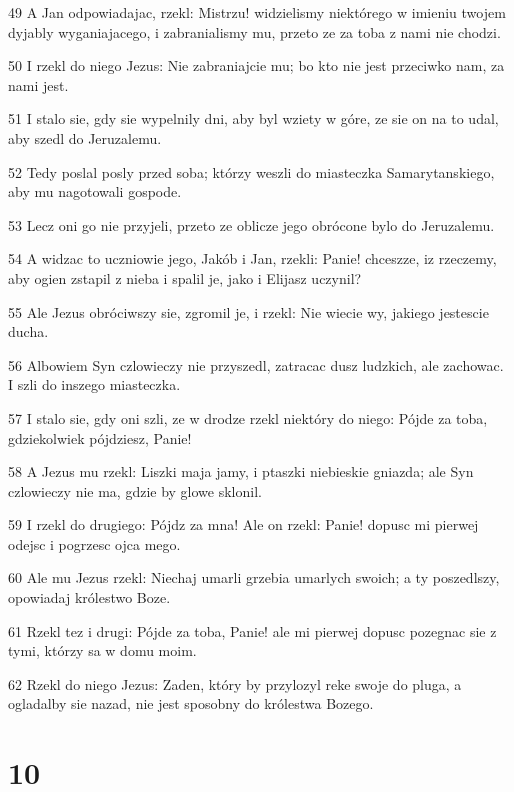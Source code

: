\par 49 A Jan odpowiadajac, rzekl: Mistrzu! widzielismy niektórego w imieniu twojem dyjably wyganiajacego, i zabranialismy mu, przeto ze za toba z nami nie chodzi.
\par 50 I rzekl do niego Jezus: Nie zabraniajcie mu; bo kto nie jest przeciwko nam, za nami jest.
\par 51 I stalo sie, gdy sie wypelnily dni, aby byl wziety w góre, ze sie on na to udal, aby szedl do Jeruzalemu.
\par 52 Tedy poslal posly przed soba; którzy weszli do miasteczka Samarytanskiego, aby mu nagotowali gospode.
\par 53 Lecz oni go nie przyjeli, przeto ze oblicze jego obrócone bylo do Jeruzalemu.
\par 54 A widzac to uczniowie jego, Jakób i Jan, rzekli: Panie! chceszze, iz rzeczemy, aby ogien zstapil z nieba i spalil je, jako i Elijasz uczynil?
\par 55 Ale Jezus obróciwszy sie, zgromil je, i rzekl: Nie wiecie wy, jakiego jestescie ducha.
\par 56 Albowiem Syn czlowieczy nie przyszedl, zatracac dusz ludzkich, ale zachowac. I szli do inszego miasteczka.
\par 57 I stalo sie, gdy oni szli, ze w drodze rzekl niektóry do niego: Pójde za toba, gdziekolwiek pójdziesz, Panie!
\par 58 A Jezus mu rzekl: Liszki maja jamy, i ptaszki niebieskie gniazda; ale Syn czlowieczy nie ma, gdzie by glowe sklonil.
\par 59 I rzekl do drugiego: Pójdz za mna! Ale on rzekl: Panie! dopusc mi pierwej odejsc i pogrzesc ojca mego.
\par 60 Ale mu Jezus rzekl: Niechaj umarli grzebia umarlych swoich; a ty poszedlszy, opowiadaj królestwo Boze.
\par 61 Rzekl tez i drugi: Pójde za toba, Panie! ale mi pierwej dopusc pozegnac sie z tymi, którzy sa w domu moim.
\par 62 Rzekl do niego Jezus: Zaden, który by przylozyl reke swoje do pluga, a ogladalby sie nazad, nie jest sposobny do królestwa Bozego.

\chapter{10}


